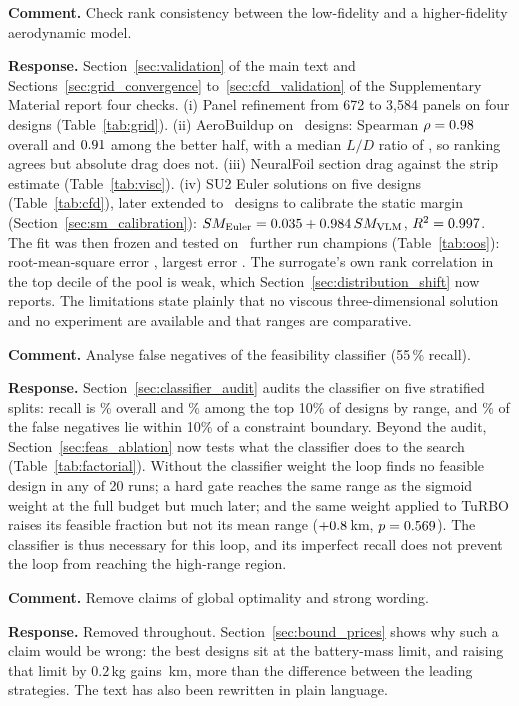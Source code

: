 \documentclass[11pt]{article}
\newcommand{\cmt}[1]{\par\medskip\noindent\textbf{Comment.} #1}
\newcommand{\rsp}[1]{\par\noindent\textbf{Response.} #1}
\begin{document}
\cmt{Check rank consistency between the low-fidelity and a higher-fidelity aerodynamic model.}
\rsp{Section~\ref{sec:validation} of the main text and Sections~\ref{sec:grid_convergence} to~\ref{sec:cfd_validation} of the Supplementary Material report four checks. (i) Panel refinement from 672 to 3,584 panels on four designs (Table~\ref{tab:grid}). (ii) AeroBuildup on \NxN\ designs: Spearman $\rho = 0.98$ overall and $0.91$ among the better half, with a median $L/D$ ratio of \NxRatioMed, so ranking agrees but absolute drag does not. (iii) NeuralFoil section drag against the strip estimate (Table~\ref{tab:visc}). (iv) SU2 Euler solutions on five designs (Table~\ref{tab:cfd}), later extended to \NcalN\ designs to calibrate the static margin (Section~\ref{sec:sm_calibration}): $SM_{\mathrm{Euler}} = 0.035 + 0.984\,SM_{\mathrm{VLM}}$, $R^2 = 0.997$. The fit was then frozen and tested on \NoosN\ further run champions (Table~\ref{tab:oos}): root-mean-square error \NoosRmse, largest error \NoosMax. The surrogate's own rank correlation in the top decile of the pool is weak, which Section~\ref{sec:distribution_shift} now reports. The limitations state plainly that no viscous three-dimensional solution and no experiment are available and that ranges are comparative.}

\cmt{Analyse false negatives of the feasibility classifier (55\,\% recall).}
\rsp{Section~\ref{sec:classifier_audit} audits the classifier on five stratified splits: recall is \NfnRecall\% overall and \NfnTenRecall\% among the top 10\% of designs by range, and \NfnWithin\% of the false negatives lie within 10\% of a constraint boundary. Beyond the audit, Section~\ref{sec:feas_ablation} now tests what the classifier does to the search (Table~\ref{tab:factorial}). Without the classifier weight the loop finds no feasible design in any of 20 runs; a hard gate reaches the same range as the sigmoid weight at the full budget but much later; and the same weight applied to TuRBO raises its feasible fraction but not its mean range ($+0.8$\,km, $p = 0.569$). The classifier is thus necessary for this loop, and its imperfect recall does not prevent the loop from reaching the high-range region.}

\cmt{Remove claims of global optimality and strong wording.}
\rsp{Removed throughout. Section~\ref{sec:bound_prices} shows why such a claim would be wrong: the best designs sit at the battery-mass limit, and raising that limit by $0.2$\,kg gains \NbpBmassGain\,km, more than the difference between the leading strategies. The text has also been rewritten in plain language.}
\end{document}
